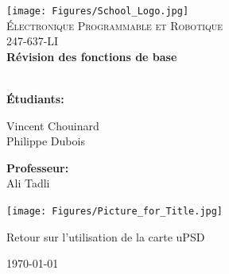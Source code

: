 \documentclass[10pt,a4paper,final]{article}
\begin{document}
\renewcommand\headrulewidth{0pt}
\fancyfoot[C]{ }






\begin{center}
\texttt{[image: Figures/School\_Logo.jpg]}~\\[1cm]  
\textsc{\LARGE \'{E}lectronique Programmable et Robotique}\\[1.5cm]
\Large 247-637-LI\\[0.5cm]
{ \huge \bfseries Révision des fonctions de base \\[0.4cm] }
\HRule \\[1.5cm]





\begin{multicols}{2}
\begin{flushleft}



\textbf{Étudiants:}\\

\bigskip

Vincent Chouinard\\ 
\bigskip
Philippe Dubois\\




\end{flushleft}
\vfill
\begin{flushright}

\textbf{Professeur:}\\
\medskip
Ali Tadli\\



\end{flushright}
\end{multicols}

\bigskip
\bigskip
\bigskip

\texttt{[image: Figures/Picture\_for\_Title.jpg]} 

\vfill
Retour sur l'utilisation de la carte uPSD
\bigskip

{\large \today}
\end{center}






\pagebreak
\tableofcontents 
\listoffigures  
\listoftables   
\pagebreak






\renewcommand\headrulewidth{1pt}
\renewcommand\footrulewidth{1pt}
\fancyfoot[R]{\today}
\end{document}
